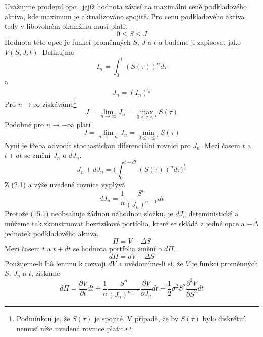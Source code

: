 \documentclass[a4paper]{book}
\begin{document}
Uvažujme prodejní opci, jejíž hodnota závisí na maximální ceně podkladového aktiva, kde maximum je aktualizováno spojitě. Pro cenu podkladového aktiva tedy v libovolném okamžiku musí platit
\begin{equation*}
0 \le S \le J
\end{equation*}
Hodnota této opce je funkcí proměnných $S$, $J$ a $t$ a budeme ji zapisovat jako $V(S,J,t)$. Definujme
\begin{equation*}
I_n = \int_0^t(S(\tau))^n d \tau
\end{equation*}
a
\begin{equation*}
J_n = (I_n)^{\frac{1}{n}}
\end{equation*}
Pro $n \rightarrow \infty$ získáváme\footnote{Podmínkou je, že $S(\tau)$ je spojité. V případě, že by $S(\tau)$ bylo diskrétní, nemusí níže uvedená rovnice platit.}
\begin{equation*}
J = \underset{n \rightarrow \infty}{\lim} J_n = \underset{0 \le \tau \le t} \max S(\tau)
\end{equation*}
Podobně pro $n \rightarrow -\infty$ platí
\begin{equation*}
J = \underset{n \rightarrow -\infty}{\lim} J_n = \underset{0 \le \tau \le t} \min S(\tau)
\end{equation*}
Nyní je třeba odvodit stochastickou diferenciální rovnici pro $J_n$. Mezi časem $t$ a $t + dt$ se změní $J_n$ o $d J_n$.
\begin{equation*}
J_n + d J_n = \Big( \int_0^{t + dt}(S(\tau))^n d \tau \Big)^{\frac{1}{n}}
\end{equation*}
Z (2.1) a výše uvedené rovnice vyplývá
\begin{equation}
d J_n = \frac{1}{n}\frac{S^n}{(J_n)^{n-1}}dt
\end{equation}
Protože (15.1) neobsahuje žádnou náhodnou složku, je $dJ_n$ deteministické a můžeme tak zkonstruovat bezrizikové portfolio, které se skládá z jedné opce a $-\Delta$ jednotek podkladového aktiva.
\begin{equation*}
\Pi = V - \Delta S
\end{equation*}
Mezi časem $t$ a $t + dt$ se hodnota portfolia změní o $d \Pi$.
\begin{equation*}
d \Pi = dV - \Delta S
\end{equation*}
Použijeme-li It\^o lemmu k rozvoji $dV$ a uvědomíme-li si, že $V$ je funkcí proměnných $S$, $J_n$ a $t$, získáme
\begin{equation}
d \Pi = \frac{\partial V}{\partial t}dt + \frac{1}{n}\frac{S^n}{(J_n)^{n-1}}\frac{\partial V}{\partial J_n}dt + \frac{1}{2}\sigma^2 S^2 \frac{\partial^2 V}{\partial S^2}dt
\end{equation}
\end{document}
